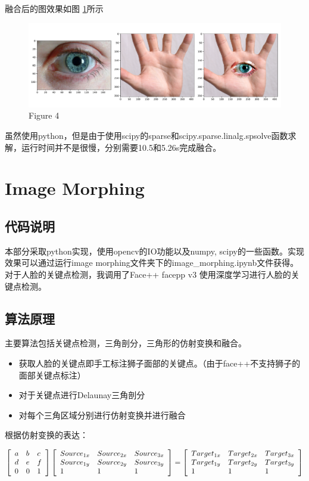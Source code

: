 \documentclass[a4paper]{article}
\begin{document}
融合后的图效果如图 \ref{fig:10}所示
\begin{figure}[htp]
\centering
\includegraphics[width=1\linewidth]{pictures/10.pdf}
\caption{Figure 4}
\label{fig:10}
\end{figure}

虽然使用python，但是由于使用scipy的sparse和scipy.sparse.linalg.spsolve函数求解，运行时间并不是很慢，分别需要10.5和5.26s完成融合。

\section{Image Morphing}
\subsection{代码说明}
本部分采取python实现，使用opencv的IO功能以及numpy, scipy的一些函数。实现效果可以通过运行image morphing文件夹下的image\_morphing.ipynb文件获得。对于人脸的关键点检测，我调用了Face++ facepp v3 使用深度学习进行人脸的关键点检测。

\subsection{算法原理}
主要算法包括关键点检测，三角剖分，三角形的仿射变换和融合。
\begin{itemize}
\item 获取人脸的关键点即手工标注狮子面部的关键点。（由于face++不支持狮子的面部关键点标注）
\item 对于关键点进行Delaunay三角剖分
\item 对每个三角区域分别进行仿射变换并进行融合
\end{itemize} 

根据仿射变换的表达：

$$
\left[ \begin{array} { l l l } { a } & { b } & { c } \\ { d } & { e } & { f } \\ { 0 } & { 0 } & { 1 } \end{array} \right]
\left[ \begin{array} { l l l } { Source_{1x} } & { Source_{2x} } & { Source_{3x} } \\ { Source_{1y} } & { Source_{2y} } & { Source_{3y} } \\ { 1 } & { 1 } & { 1 } \end{array} \right] = \left[ \begin{array} { l l l } { Target_{1x} } & { Target_{2x} } & { Target_{3x} } \\ { Target_{1y} } & { Target_{2y} } & { Target_{3y} } \\ { 1 } & { 1 } & { 1 } \end{array} \right]
$$
\end{document}

